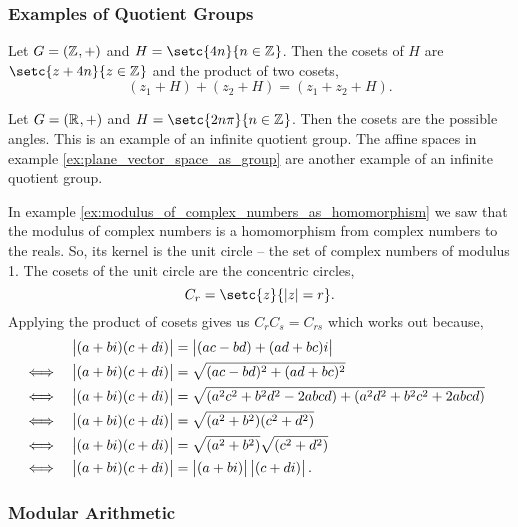 \documentclass[MathsNotesBase.tex]{subfiles}
\begin{document}
{	\subsubsection{Examples of Quotient Groups}
	\begin{exe}
		\item{Let ${ G = (\mathbb{Z}^{}, +) }$ and ${ H = \setc{4n}{n \in \Z{}} }$. Then the cosets of $H$ are ${ \setc{z + 4n}{z \in \Z{}} }$ and the product of two cosets,
			\[ (z_1 + H) + (z_2 + H) = (z_1 + z_2 + H). \]
		}
		\item{Let ${ G = (\mathbb{R}^{}, +) }$ and ${ H = \setc{2n\pi}{n \in \Z{}} }$. Then the cosets are the possible angles. This is an example of an infinite quotient group. The affine spaces in example \ref{ex:plane_vector_space_as_group} are another example of an infinite quotient group.}
		\medskip
		\item{In example \ref{ex:modulus_of_complex_numbers_as_homomorphism} we saw that the modulus of complex numbers is a homomorphism from complex numbers to the reals. So, its kernel is the unit circle -- the set of complex numbers of modulus 1. The cosets of the unit circle are the concentric circles,
			\[ C_r = \setc{z}{ \abs{z} = r }. \]
		Applying the product of cosets gives us ${ C_rC_s = C_{rs} }$ which works out because,
		\begin{align*}
		&& \left\lvert(a + bi)(c + di)\right\rvert &= \left\lvert(ac - bd) + (ad + bc)i\right\rvert \\
		&\iff & \left\lvert(a + bi)(c + di)\right\rvert &= \sqrt{(ac - bd)^2 + (ad + bc)^2} &\text{\scriptsize{}} \\
		&\iff & \left\lvert(a + bi)(c + di)\right\rvert &= \sqrt{(a^2c^2 + b^2d^2 - 2abcd) + (a^2d^2 + b^2c^2 + 2abcd)} \\
		&\iff & \left\lvert(a + bi)(c + di)\right\rvert &= \sqrt{(a^2 + b^2)(c^2 + d^2)} \\
		&\iff & \left\lvert(a + bi)(c + di)\right\rvert &= \sqrt{(a^2 + b^2)}\sqrt{(c^2 + d^2)} \\
		&\iff & \left\lvert(a + bi)(c + di)\right\rvert &= \left\lvert(a + bi)\right\rvert\left\lvert(c + di)\right\rvert. \\
		\end{align*}
		}
	\end{exe}

	
	\bigskip
	\subsubsection{Modular Arithmetic}
}
\end{document}
